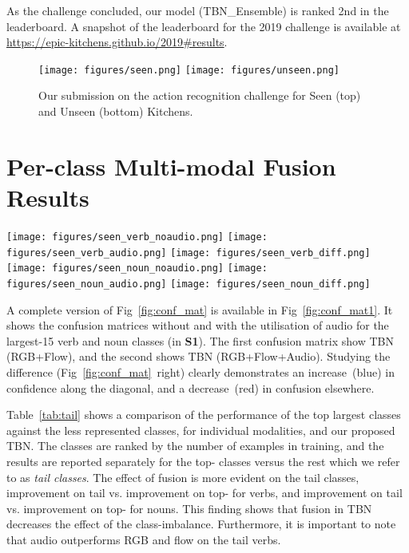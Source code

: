 \documentclass[10pt,twocolumn,letterpaper]{article}
\begin{document}
As the challenge concluded, our model (TBN\_Ensemble) is ranked 2nd in the leaderboard. A snapshot of the leaderboard for the 2019 challenge is available at\\ \url{https://epic-kitchens.github.io/2019#results}. 



 \begin{figure}[t]
 \texttt{[image: figures/seen.png]}
 \texttt{[image: figures/unseen.png]}
 \caption{Our submission on the action recognition challenge for Seen (top) and Unseen (bottom) Kitchens.}
 \label{fig:challengeMar}
 \end{figure}

 
\section{Per-class Multi-modal Fusion Results}
\label{sec:perclass}
 

\begin{figure*}[t]
	\centering
	\texttt{[image: figures/seen\_verb\_noaudio.png]}
	\texttt{[image: figures/seen\_verb\_audio.png]}
	\texttt{[image: figures/seen\_verb\_diff.png]} 
	\texttt{[image: figures/seen\_noun\_noaudio.png]}
	\texttt{[image: figures/seen\_noun\_audio.png]}
	\texttt{[image: figures/seen\_noun\_diff.png]} 
	\caption{Confusion matrices for largest-15 verb classes (top) and the largest-15 noun classes (bottom), without (left) and with (middle) audio, as well as their difference (right).}
	\label{fig:conf_mat1}
\end{figure*}
A complete version of Fig~\ref{fig:conf_mat} is available in Fig~\ref{fig:conf_mat1}. It shows the confusion matrices without and with the utilisation of audio for
the largest-15 verb and noun classes (in \textbf{S1}). The first confusion matrix show TBN (RGB+Flow), and the second shows TBN (RGB+Flow+Audio). Studying the difference (Fig~\ref{fig:conf_mat}~right) clearly demonstrates an increase~(blue) in confidence along the diagonal, and a decrease~(red) in confusion
elsewhere.





Table~\ref{tab:tail} shows a comparison of the performance of the top largest classes against the less represented classes, for individual modalities, and our proposed TBN. The classes are ranked by the number of examples in training, and the results are reported separately for the top- classes versus the rest which we refer to as \textit{tail classes}. The effect of fusion is more evident on the tail classes,  improvement on tail vs.  improvement on top- for verbs, and  improvement on tail vs.  improvement on top- for nouns. This finding shows that fusion in TBN decreases the effect of the class-imbalance. Furthermore, it is important to note that audio outperforms RGB and flow on
the tail verbs. 
\end{document}
